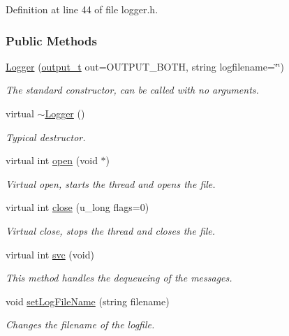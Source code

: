 Definition at line 44 of file logger.h.\subsubsection*{Public Methods}
\begin{CompactItemize}
\item 
\hyperlink{classLogger_Loggera0}{Logger} (\hyperlink{logger_8h_a3}{output\_\-t} out=OUTPUT\_\-BOTH, string logfilename=\char`\"{}\char`\"{})
\begin{CompactList}\small\item\em The standard constructor, can be called with no arguments.\item\end{CompactList}\item 
virtual \hyperlink{classLogger_Loggera1}{$\sim$Logger} ()
\begin{CompactList}\small\item\em Typical destructor.\item\end{CompactList}\item 
virtual int \hyperlink{classLogger_Loggera2}{open} (void $\ast$)
\begin{CompactList}\small\item\em Virtual open, starts the thread and opens the file.\item\end{CompactList}\item 
virtual int \hyperlink{classLogger_Loggera3}{close} (u\_\-long flags=0)
\begin{CompactList}\small\item\em Virtual close, stops the thread and closes the file.\item\end{CompactList}\item 
virtual int \hyperlink{classLogger_Loggera4}{svc} (void)
\begin{CompactList}\small\item\em This method handles the dequeueing of the messages.\item\end{CompactList}\item 
void \hyperlink{classLogger_Loggera5}{set\-Log\-File\-Name} (string filename)
\begin{CompactList}\small\item\em Changes the filename of the logfile.\item\end{CompactList}\item 

\end{CompactItemize}
